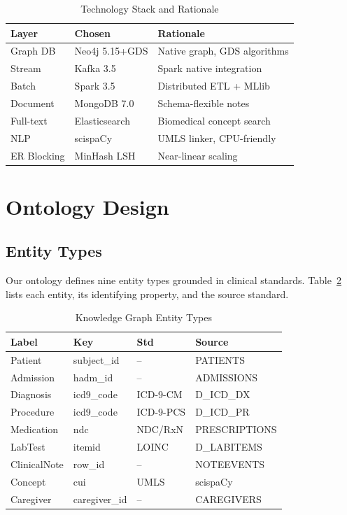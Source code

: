\documentclass[conference]{IEEEtran}
\begin{document}
\begin{table}[htbp]
\caption{Technology Stack and Rationale}
\label{tab:stack}
\centering
\small
\begin{tabular}{@{}llp{3.2cm}@{}}
\toprule
\textbf{Layer} & \textbf{Chosen} & \textbf{Rationale} \\
\midrule
Graph DB     & Neo4j 5.15+GDS  & Native graph, GDS algorithms \\
Stream       & Kafka 3.5       & Spark native integration \\
Batch        & Spark 3.5       & Distributed ETL + MLlib \\
Document     & MongoDB 7.0     & Schema-flexible notes \\
Full-text    & Elasticsearch   & Biomedical concept search \\
NLP          & scispaCy        & UMLS linker, CPU-friendly \\
ER Blocking  & MinHash LSH     & Near-linear scaling \\
\bottomrule
\end{tabular}
\end{table}

\section{Ontology Design}

\subsection{Entity Types}

Our ontology defines nine entity types grounded in clinical standards.
Table~\ref{tab:entities} lists each entity, its identifying property,
and the source standard.

\begin{table}[htbp]
\caption{Knowledge Graph Entity Types}
\label{tab:entities}
\centering
\small
\begin{tabular}{@{}llll@{}}
\toprule
\textbf{Label} & \textbf{Key} & \textbf{Std} & \textbf{Source} \\
\midrule
Patient      & subject\_id    & --       & PATIENTS \\
Admission    & hadm\_id       & --       & ADMISSIONS \\
Diagnosis    & icd9\_code     & ICD-9-CM & D\_ICD\_DX \\
Procedure    & icd9\_code     & ICD-9-PCS& D\_ICD\_PR \\
Medication   & ndc            & NDC/RxN  & PRESCRIPTIONS \\
LabTest      & itemid         & LOINC    & D\_LABITEMS \\
ClinicalNote & row\_id        & --       & NOTEEVENTS \\
Concept      & cui            & UMLS     & scispaCy \\
Caregiver    & caregiver\_id  & --       & CAREGIVERS \\
\bottomrule
\end{tabular}
\end{table}
\end{document}
